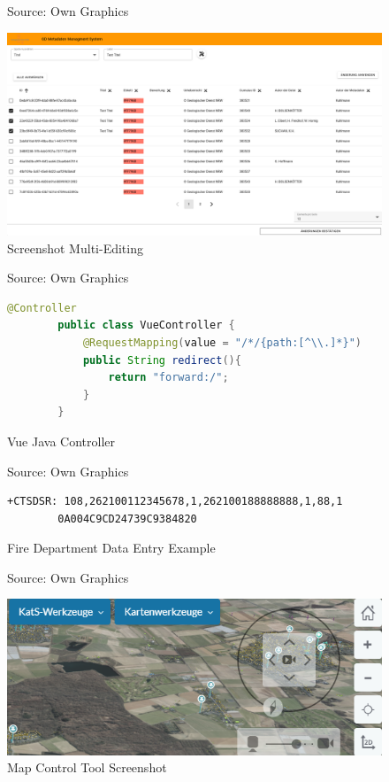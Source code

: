 \documentclass[11pt, titlepage, a4paper]{article}
\newcommand{\source}[1]{\caption*{Source: {#1}} }
\begin{document}
\begin{appendices}
\begin{figure}[H]
        \caption{Screenshot Multi-Editing}
        \source{Own Graphics}
        \label{fig:multiedit}
        \includegraphics[width=16cm]{multiedit.png}
        \centering
    \end{figure}
    \begin{figure}[H]
        \caption{Vue Java Controller}
        \source{Own Graphics}
        \label{fig:vue}
        \begin{lstlisting}[language=java, frame=single]
        @Controller
        public class VueController {
            @RequestMapping(value = "/*/{path:[^\\.]*}")
            public String redirect(){
                return "forward:/";
            }
        }
        \end{lstlisting}
        \centering
    \end{figure}
    \begin{figure}[t]
        \caption{Fire Department Data Entry Example}
        \source{Own Graphics}
        \label{fig:pei}
        \begin{lstlisting}[frame=single]
        +CTSDSR: 108,262100112345678,1,262100188888888,1,88,1
        0A004C9CD24739C9384820
    \end{lstlisting}
        \centering
    \end{figure}

    \begin{figure}[H]
        \caption{Map Control Tool Screenshot}
        \source{Own Graphics}
        \label{fig:mapcontrol}
        \includegraphics[width=16cm]{dzgefahr_mapcontrol.png}
        \centering
    \end{figure}
\end{appendices}
\end{document}

